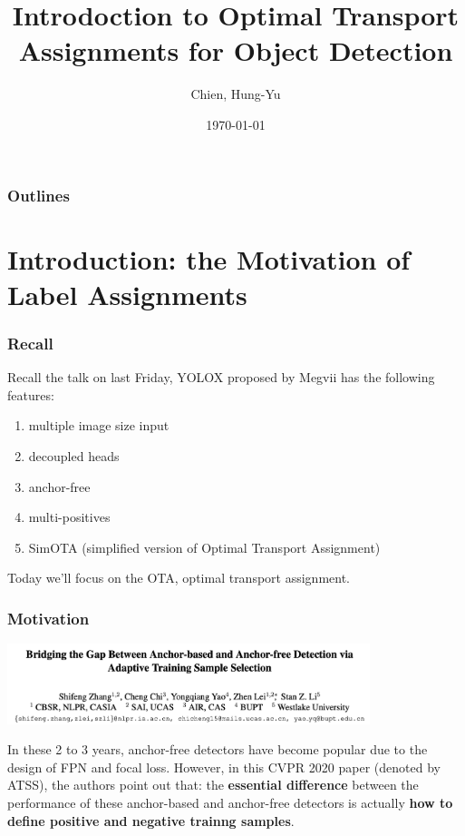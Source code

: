\documentclass[slidetop, mathserif, dvipsnames]{beamer}
\title[OTA]{Introdoction to Optimal Transport Assignments for Object Detection}
\author[chy1010]{Chien, Hung-Yu}
\date{\today}
\begin{document}
\begin{frame}
	\titlepage
\end{frame}

\section[Outline]{}
\begin{frame}
	\frametitle{Outlines}
	\tableofcontents
\end{frame}

\section{Introduction: the Motivation of Label Assignments}

\begin{frame}
    \frametitle{Recall}
    Recall the talk on last Friday, YOLOX proposed by Megvii has the following features:
    \begin{enumerate}
        \item multiple image size input
        \item decoupled heads
        \item anchor-free
        \item multi-positives
        \item SimOTA (simplified version of Optimal Transport Assignment)
    \end{enumerate}

    \quad

    Today we'll focus on the OTA, optimal transport assignment.

\end{frame}

\begin{frame}
    \frametitle{Motivation}

    \includegraphics[width=300pt]{pics/atss_paper.png}

    \quad

    In these 2 to 3 years, anchor-free detectors have become popular
    due to the design of FPN and focal loss.
    However, in this CVPR 2020 paper (denoted by ATSS), the authors point out that:
    the {\bf essential difference} between the performance of these
    anchor-based and anchor-free detectors is actually
    {\bf how to define positive and negative trainng samples}.

\end{frame}
\end{document}
